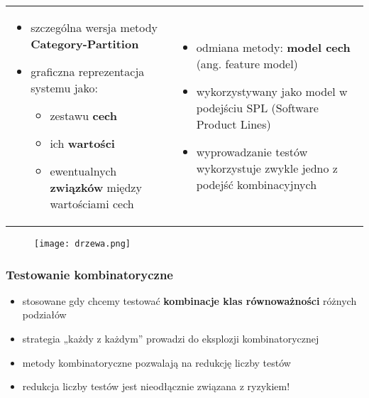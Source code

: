 \documentclass[../main.tex]{subfiles}
\begin{document}
    \begin{table}[H]
        \begin{center}
            \begin{tabular}{ p{8cm} p{8cm}}
                \begin{itemize}
                    \item szczególna wersja metody \textbf{Category-Partition}
                    \item graficzna reprezentacja systemu jako:
                    \begin{itemize}
                        \item zestawu \textbf{cech}
                        \item ich \textbf{wartości}
                        \item ewentualnych \textbf{związków} między wartościami cech
                    \end{itemize}
                \end{itemize}

                &
                \begin{itemize}
                    \item odmiana metody: \textbf{model cech} (ang. feature model)
                    \item wykorzystywany jako model w podejściu SPL (Software Product Lines)
                    \item wyprowadzanie testów wykorzystuje zwykle jedno z podejść
                    kombinacyjnych
                \end{itemize}

            \end{tabular}
        \end{center}
    \end{table}

    \begin{figure}[H]
        \texttt{[image: drzewa.png]}
    \end{figure}

    \subsubsection{Testowanie kombinatoryczne}
    \begin{itemize}
        \item stosowane gdy chcemy testować \textbf{kombinacje klas równoważności}
        różnych podziałów
        \item strategia „każdy z każdym” prowadzi do eksplozji kombinatorycznej
        \item metody kombinatoryczne pozwalają na redukcję liczby testów
        \item redukcja liczby testów jest nieodłącznie związana z ryzykiem!
    \end{itemize}
\end{document}
